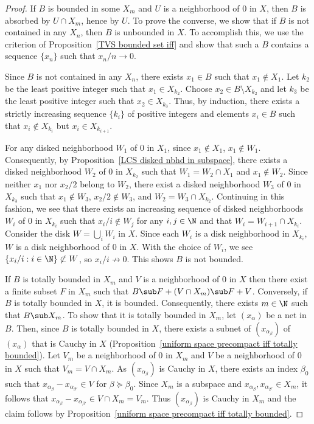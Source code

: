 \begin{proof}
If $B$ is bounded in some $X_m$ and $U$ is a neighborhood of $0$ in $X$, then $B$ is absorbed by $U\cap X_m$, hence by $U$. To prove the converse, we show that if $B$ is not contained in any $X_n$, then $B$ is unbounded in $X$. To accomplish this, we use the criterion of Proposition~\ref{TVS bounded set iff} and show that such a $B$ contains a sequence $\{x_n\}$ such that $x_n/n\to 0$.\par
Since $B$ is not contained in any $X_n$, there exists $x_1\in B$ such that $x_1\notin X_1$. Let $k_2$ be the least positive integer such that $x_1\in X_{k_2}$. Choose $x_2\in B\setminus X_{k_2}$ and let $k_3$ be the least positive integer such that $x_2\in X_{k_3}$. Thus, by induction, there exists a strictly increasing sequence $\{k_i\}$ of positive integers and elements $x_i\in B$ such that $x_i\notin X_{k_i}$ but $x_i\in X_{k_{i+1}}$.\par
For any disked neighborhood $W_1$ of $0$ in $X_1$, since $x_1\notin X_1$, $x_1\notin W_1$. Consequently, by Proposition~\ref{LCS disked nbhd in subspace}, there exists a disked neighborhood $W_2$ of $0$ in $X_{k_2}$ such that $W_1=W_2\cap X_1$ and $x_1\notin W_2$. Since neither $x_1$ nor $x_2/2$ belong to $W_2$, there exist a disked neighborhood $W_3$ of $0$ in $X_{k_3}$ such that $x_1\notin W_3$, $x_2/2\notin W_3$, and $W_2=W_3\cap X_{k_2}$. Continuing in this fashion, we see that there exists an increasing sequence of disked neighborhoods $W_i$ of $0$ in $X_{k_i}$ such that $x_i/i\notin W_j$ for any $i,j\in\N$ and that $W_{i}=W_{i+1}\cap X_{k_i}$. Consider the disk $W=\bigcup_{i}W_i$ in $X$. Since each $W_i$ is a disk neighborhood in $X_{k_i}$, $W$ is a disk neighborhood of $0$ in $X$. With the choice of $W_i$, we see $\{x_i/i:i\in\N\}\not\subset W$, so $x_i/i\not\to 0$. This shows $B$ is not bounded.\par
If $B$ is totally bounded in $X_m$ and $V$ is a neighborhood of $0$ in $X$ then there exist a finite subset $F$ in $X_m$ such that $B\sub F+(V\cap X_m)\sub F+V$. Conversely, if $B$ is totally bounded in $X$, it is bounded. Consequently, there exists $m\in\N$ such that $B\sub X_m$. To show that it is totally bounded in $X_m$, let $(x_\alpha)$ be a net in $B$. Then, since $B$ is totally bounded in $X$, there exists a subnet of $(x_{\alpha_\beta})$ of $(x_\alpha)$ that is Cauchy in $X$ (Proposition~\ref{uniform space precompact iff totally bounded}). Let $V_m$ be a neighborhood of $0$ in $X_m$ and $V$ be a neighborhood of $0$ in $X$ such that $V_m=V\cap X_m$. As $(x_{\alpha_\beta})$ is Cauchy in $X$, there exists an index $\beta_0$ such that $x_{\alpha_{\beta}}-x_{\alpha_{\beta'}}\in V$ for $\beta\succeq\beta_0$. Since $X_m$ is a subspace and $x_{\alpha_{\beta}},x_{\alpha_{\beta'}}\in X_m$, it follows that $x_{\alpha_{\beta}}-x_{\alpha_{\beta'}}\in V\cap X_m=V_m$. Thus $(x_{\alpha_\beta})$ is Cauchy in $X_m$ and the claim follows by Proposition~\ref{uniform space precompact iff totally bounded}.\par

\end{proof}
